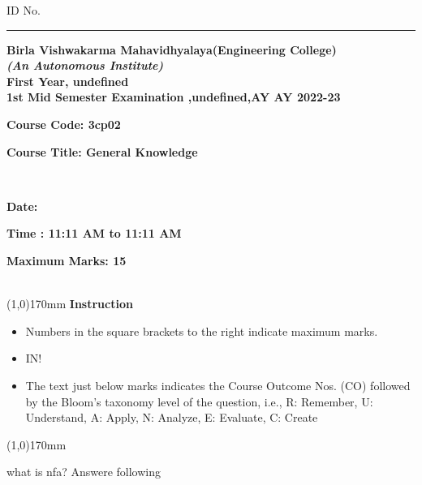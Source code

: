 \documentclass[addpoints,12pt]{exam}
\begin{document}
      \hspace{-7mm}ID No.\rule{20mm}{0.3mm}
      \begin{center}
   \textbf{Birla Vishwakarma Mahavidhyalaya(Engineering College)} \\
    \textbf{\textit{(An Autonomous Institute)}} \\
    \textbf{First Year, undefined} \\
    \textbf{1st Mid Semester Examination ,undefined,AY AY 2022-23} \\
    \vspace{4mm}
   
   
    \end{center}
   
    \hspace{-7mm}
    \parbox[t]{50mm}{\textbf{Course Code: 3cp02}}
    \parbox[t]{100mm}{\textbf{Course Title: General Knowledge}}\vspace{2mm}\\
    \parbox[t]{50mm}{\textbf{Date: }}
    \parbox[t]{75mm}{\textbf{Time : 11:11 AM to 11:11 AM}}
    \parbox[t]{50mm}{\textbf{Maximum Marks: 15}}\\
    \line(1,0){170mm} \vspace{2mm}
    \hspace{-6mm}\textbf{Instruction}
  
   
  
    \begin{itemize}[leftmargin=4mm,rightmargin=-2cm]
        \item Numbers in the square brackets to the right indicate maximum marks.
       \item IN!
        \item The text just below marks indicates the Course Outcome Nos. (CO) followed by the Bloom’s taxonomy level of the question, i.e., R: Remember, U: Understand, A: Apply, N: Analyze, E: Evaluate, C: Create
    \end{itemize}
    \line(1,0){170mm}
   \vspace{5mm}
\begin{questions}
\pointname{}\pointsinrightmargin\question[5]
\vspace{-\baselineskip}\vspace{3.5mm}what is nfa?
\question[10]
\vspace{-\baselineskip}\vspace{3.5mm}Answere following
\end{questions}
\end{document}
